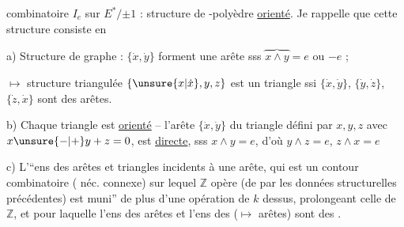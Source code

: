 combinatoire $I_e$ sur $E^*/{\pm1}$ : structure de  -polyèdre \uline{orienté}. Je rappelle que cette structure consiste en

a) Structure de graphe : $\{\dot x,\dot y\}$ forment une arête  sss $\overbrace{x\wedge y}=e$ ou $-e$ ;

$\longmapsto$ structure triangulée $\{\unsure{x|\dot x},y,z\}$ est un triangle ssi $\{\dot x,\dot y\}$, $\{\dot y,\dot z\}$, $\{\dot z,\dot x\}$ sont des arêtes.


b) Chaque triangle est \uline{orienté} --  l'arête $\{\dot x,\dot y\}$ du triangle défini par $x,y,z$ avec $x\unsure{-|+}y+z=0$,  est \uline{directe}, sss $x\wedge y=e$, d'où $y\wedge z=e$, $z\wedge x=e$


c) L'``ens des arêtes et triangles incidents à une arête, qui est un contour combinatoire ( néc. connexe) sur lequel $\mathbb Z$ opère (de par les données structurelles précédentes) est muni'' de plus d'une opération de $k$ dessus, prolongeant celle de $\mathbb Z$, et pour laquelle l'ens des arêtes  et l'ens des  ($\longmapsto$ arêtes) sont des .

